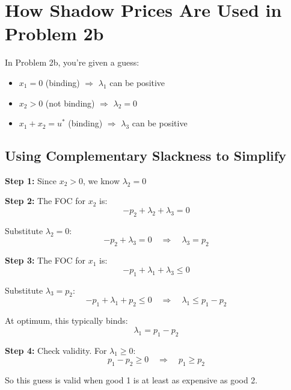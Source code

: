 \documentclass[11pt]{article}
\begin{document}
\section{How Shadow Prices Are Used in Problem 2b}

In Problem 2b, you're given a guess:
\begin{itemize}
\item $x_1 = 0$ (binding) $\Rightarrow$ $\lambda_1$ can be positive
\item $x_2 > 0$ (not binding) $\Rightarrow$ $\lambda_2 = 0$
\item $x_1 + x_2 = u^*$ (binding) $\Rightarrow$ $\lambda_3$ can be positive
\end{itemize}

\subsection{Using Complementary Slackness to Simplify}

\textbf{Step 1:} Since $x_2 > 0$, we know $\lambda_2 = 0$

\textbf{Step 2:} The FOC for $x_2$ is:
\begin{equation}
-p_2 + \lambda_2 + \lambda_3 = 0
\end{equation}

Substitute $\lambda_2 = 0$:
\begin{equation}
-p_2 + \lambda_3 = 0 \quad \Rightarrow \quad \lambda_3 = p_2
\end{equation}

\textbf{Step 3:} The FOC for $x_1$ is:
\begin{equation}
-p_1 + \lambda_1 + \lambda_3 \leq 0
\end{equation}

Substitute $\lambda_3 = p_2$:
\begin{equation}
-p_1 + \lambda_1 + p_2 \leq 0 \quad \Rightarrow \quad \lambda_1 \leq p_1 - p_2
\end{equation}

At optimum, this typically binds:
\begin{equation}
\lambda_1 = p_1 - p_2
\end{equation}

\textbf{Step 4:} Check validity. For $\lambda_1 \geq 0$:
\begin{equation}
p_1 - p_2 \geq 0 \quad \Rightarrow \quad p_1 \geq p_2
\end{equation}

So this guess is valid when good 1 is at least as expensive as good 2.
\end{document}
